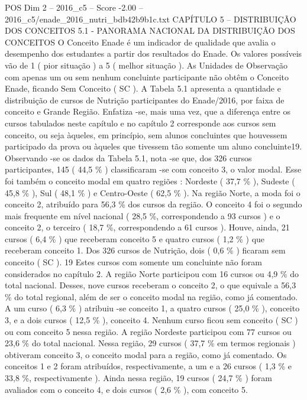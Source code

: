 \begin{textsample}{POS Dim 2 – 2016\_c5 – Score -2.00 – 2016\_c5/enade\_2016\_nutri\_bdb42b9b1c.txt}  \label{ex:f2_pos_398}
CAPÍTULO 5 – DISTRIBUIÇÃO DOS CONCEITOS 5.1 - PANORAMA NACIONAL DA DISTRIBUIÇÃO DOS CONCEITOS O Conceito Enade é um indicador de qualidade que avalia o desempenho dos estudantes a partir dos resultados do Enade.
Os valores possíveis vão de 1 ( pior situação ) a 5 ( melhor situação ).
As Unidades de Observação com apenas um ou sem nenhum concluinte participante não obtêm o Conceito Enade, ficando Sem Conceito ( SC ).
A Tabela 5.1 apresenta a quantidade e distribuição de cursos de Nutrição participantes do Enade/2016, por faixa de conceito e Grande Região.
Enfatiza -se, mais uma vez, que a diferença entre os cursos tabulados neste capítulo e no capítulo 2 corresponde aos cursos sem conceito, ou seja àqueles, em princípio, sem alunos concluintes que houvessem participado da prova ou àqueles que tivessem tão somente um aluno concluinte19.
Observando -se os dados da Tabela 5.1, nota -se que, dos 326 cursos participantes, 145 ( 44,5 \% ) classificaram -se com conceito 3, o valor modal.
Esse foi também o conceito modal em quatro regiões : Nordeste ( 37,7 \% ), Sudeste ( 45,8 \% ), Sul ( 48,1 \% ) e Centro-Oeste ( 62,5 \% ).
Na região Norte, a moda foi o conceito 2, atribuído para 56,3 \% dos cursos da região.
O conceito 4 foi o segundo mais frequente em nível nacional ( 28,5 \%, correspondendo a 93 cursos ) e o conceito 2, o terceiro ( 18,7 \%, correspondendo a 61 cursos ).
Houve, ainda, 21 cursos ( 6,4 \% ) que receberam conceito 5 e quatro cursos ( 1,2 \% ) que receberam conceito 1.
Dos 326 cursos de Nutrição, dois ( 0,6 \% ) ficaram sem conceito ( SC ). 19 Estes cursos com somente um concluinte não foram considerados no capítulo 2.
A região Norte participou com 16 cursos ou 4,9 \% do total nacional.
Desses, nove cursos receberam o conceito 2, o que equivale a 56,3 \% do total regional, além de ser o conceito modal na região, como já comentado.
A um curso ( 6,3 \% ) atribuiu -se conceito 1, a quatro cursos ( 25,0 \% ), conceito 3, e a dois cursos ( 12,5 \% ), conceito 4.
Nenhum curso ficou sem conceito ( SC ) ou com conceito 5 nessa região.
A região Nordeste participou com 77 cursos ou 23,6 \% do total nacional.
Nessa região, 29 cursos ( 37,7 \% em termos regionais ) obtiveram conceito 3, o conceito modal para a região, como já comentado.
Os conceitos 1 e 2 foram atribuídos, respectivamente, a um e a 26 cursos ( 1,3 \% e 33,8 \%, respectivamente ).
Ainda nessa região, 19 cursos ( 24,7 \% ) foram avaliados com o conceito 4, e dois cursos ( 2,6 \% ), com conceito 5.

\end{textsample}
